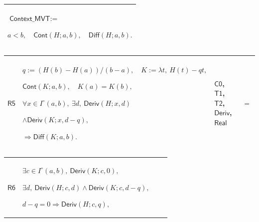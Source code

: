 \documentclass[11pt]{amsart}
\newlength{\FTCOneColumnBody}
\newlength{\FTCFourColumnBody}
\begin{document}
{\begin{tabular}
\end{tabular}%
\par\setlength{\parskip}{0pt}\nointerlineskip
\noindent
\begin{tabular}{|@{}>{\centering\arraybackslash}m{\FTCOneColumnBody}|}\hline
$\displaystyle \textsf{Context\_MVT}:=$\par
$\displaystyle a<b,\quad\textsf{Cont}(H;a,b),\quad\textsf{Diff}(H;a,b).$\\ \hline
\end{tabular}%
\par\setlength{\parskip}{0pt}\nointerlineskip
\noindent
\begin{tabular}{|@{}>{\centering\arraybackslash}m{0.078431\FTCFourColumnBody}|>{\centering\arraybackslash}m{0.535947\FTCFourColumnBody}|>{\centering\arraybackslash}m{0.281045\FTCFourColumnBody}|>{\centering\arraybackslash}m{0.104575\FTCFourColumnBody}|}\hline
\hypertarget{proof:R5}{$\displaystyle \textsf{R5}$} & $\displaystyle q:=(H(b)-H(a))/(b-a),\quad K:=\lambda t,\ H(t)-qt,$\par
$\displaystyle \textsf{Cont}(K;a,b),\quad K(a)=K(b),$\par
$\displaystyle \forall x\in I^\circ(a,b),\ \exists d,\ \textsf{Deriv}(H;x,d)$\par
$\displaystyle \land\textsf{Deriv}(K;x,d-q),$\par
$\displaystyle \Rightarrow\textsf{Diff}(K;a,b).$ & \hyperlink{proof:C0}{$\displaystyle \textsf{C0}$}, \hyperlink{proof:T1}{$\displaystyle \textsf{T1}$}, \hyperlink{proof:T2}{$\displaystyle \textsf{T2}$}, \hyperlink{def:Deriv}{$\displaystyle \textsf{Deriv}$}, \hyperlink{ax:Real}{$\displaystyle \textsf{Real}$} & $\displaystyle =$\\ \hline
\end{tabular}%
\par\setlength{\parskip}{0pt}\nointerlineskip
\noindent
\begin{tabular}{|@{}>{\centering\arraybackslash}m{0.078431\FTCFourColumnBody}|>{\centering\arraybackslash}m{0.535947\FTCFourColumnBody}|>{\centering\arraybackslash}m{0.281045\FTCFourColumnBody}|>{\centering\arraybackslash}m{0.104575\FTCFourColumnBody}|}\hline
\hypertarget{proof:R6}{$\displaystyle \textsf{R6}$} & $\displaystyle \exists c\in I^\circ(a,b),\ \textsf{Deriv}(K;c,0),$\par
$\displaystyle \exists d,\ \textsf{Deriv}(H;c,d)\land\textsf{Deriv}(K;c,d-q),$\par
$\displaystyle d-q=0\Rightarrow\textsf{Deriv}(H;c,q),$\par

\end{tabular}}
\end{document}
